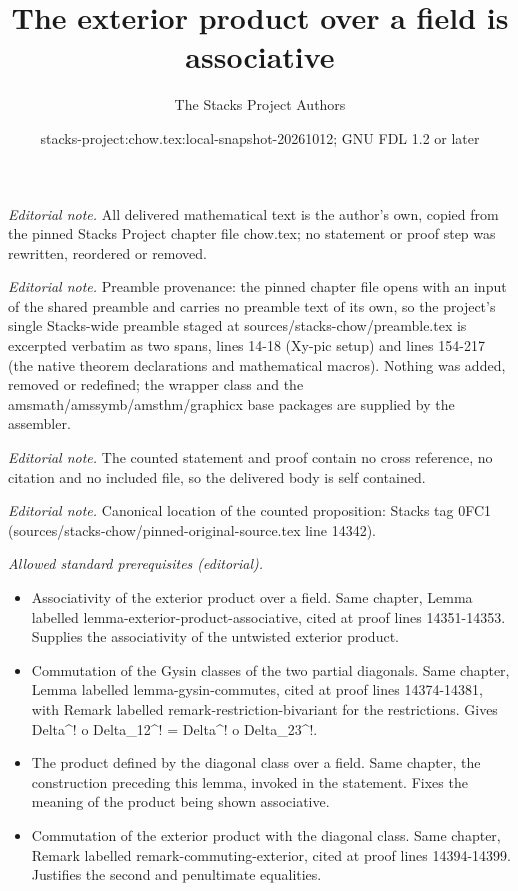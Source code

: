 \documentclass[10pt,a4paper]{amsart}
\title{The exterior product over a field is associative}
\author{The Stacks Project Authors}
\date{stacks-project:chow.tex:local-snapshot-20261012; GNU FDL 1.2 or later}
\theoremstyle{plain}
\theoremstyle{definition}
\theoremstyle{remark}
\numberwithin{equation}{subsection}
\begin{document}
\maketitle
\noindent\textit{Editorial note.} All delivered mathematical text is the author's own, copied from the pinned Stacks Project chapter file chow.tex; no statement or proof step was rewritten, reordered or removed.\par\medskip
\noindent\textit{Editorial note.} Preamble provenance: the pinned chapter file opens with an input of the shared preamble and carries no preamble text of its own, so the project's single Stacks-wide preamble staged at sources/stacks-chow/preamble.tex is excerpted verbatim as two spans, lines 14-18 (Xy-pic setup) and lines 154-217 (the native theorem declarations and mathematical macros). Nothing was added, removed or redefined; the wrapper class and the amsmath/amssymb/amsthm/graphicx base packages are supplied by the assembler.\par\medskip
\noindent\textit{Editorial note.} The counted statement and proof contain no cross reference, no citation and no included file, so the delivered body is self contained.\par\medskip
\noindent\textit{Editorial note.} Canonical location of the counted proposition: Stacks tag 0FC1 (sources/stacks-chow/pinned-original-source.tex line 14342).\par\medskip
\noindent\textit{Allowed standard prerequisites (editorial).}\begin{itemize}
\item Associativity of the exterior product over a field. Same chapter, Lemma labelled lemma-exterior-product-associative, cited at proof lines 14351-14353. Supplies the associativity of the untwisted exterior product.
\item Commutation of the Gysin classes of the two partial diagonals. Same chapter, Lemma labelled lemma-gysin-commutes, cited at proof lines 14374-14381, with Remark labelled remark-restriction-bivariant for the restrictions. Gives Delta\textasciicircum{}! o Delta\_12\textasciicircum{}! = Delta\textasciicircum{}! o Delta\_23\textasciicircum{}!.
\item The product defined by the diagonal class over a field. Same chapter, the construction preceding this lemma, invoked in the statement. Fixes the meaning of the product being shown associative.
\item Commutation of the exterior product with the diagonal class. Same chapter, Remark labelled remark-commuting-exterior, cited at proof lines 14394-14399. Justifies the second and penultimate equalities.
\end{itemize}\medskip
\end{document}

